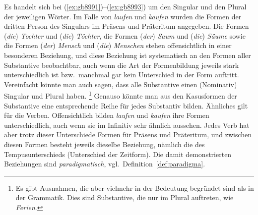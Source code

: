 \begin{exe}
  \ex\label{ex:gb8991}
  \begin{xlist}
  \end{xlist}
  \ex\label{ex:gb8992}
  \begin{xlist}
  \end{xlist}
  \ex\label{ex:gb8993}
  \begin{xlist}
  \end{xlist}
  \ex\label{ex:gb8994}
  \begin{xlist}
  \end{xlist}
  \ex\label{ex:gb8995}
  \begin{xlist}
  \end{xlist}
\end{exe}

Es handelt sich bei (\ref{ex:gb8991})--(\ref{ex:gb8993}) um den Singular und den Plural der jeweiligen Wörter.
Im Falle von \textit{laufen} und \textit{kaufen} wurden die Formen der dritten Person des Singulars im Präsens und Präteritum angegeben.
Die Formen (\textit{die}) \textit{Tochter} und (\textit{die}) \textit{Töchter}, die Formen (\textit{der}) \textit{Saum} und (\textit{die}) \textit{Säume} sowie die Formen (\textit{der}) \textit{Mensch} und (\textit{die}) \textit{Menschen} stehen offensichtlich in einer besonderen Beziehung, und diese Beziehung ist systematisch an den Formen aller Substantive beobachtbar, auch wenn die Art der Formenbildung jeweils stark unterschiedlich ist bzw.\ manchmal gar kein Unterschied in der Form auftritt.
Vereinfacht könnte man auch sagen, dass alle Substantive einen (Nominativ) Singular und Plural haben.%
\footnote{Es gibt Ausnahmen, die aber vielmehr in der Bedeutung begründet sind als in der Grammatik.
Dies sind \zB Substantive, die nur im Plural auftreten, wie \textit{Ferien}.}
Genauso könnte man aus den Kasusformen der Substantive eine entsprechende Reihe für jedes Substantiv bilden.
Ähnliches gilt für die Verben.
Offensichtlich bilden \textit{laufen} und \textit{kaufen} ihre Formen unterschiedlich, auch wenn sie im Infinitiv sehr ähnlich aussehen.
Jedes Verb hat aber trotz dieser Unterschiede Formen für Präsens und Präteritum, und zwischen diesen Formen besteht jeweils dieselbe Beziehung, nämlich die des Tempusunterschieds (Unterschied der Zeitform).
Die damit demonstrierten Beziehungen sind \textit{paradigmatisch}, vgl.\ Definition~\ref{def:paradigma}.


